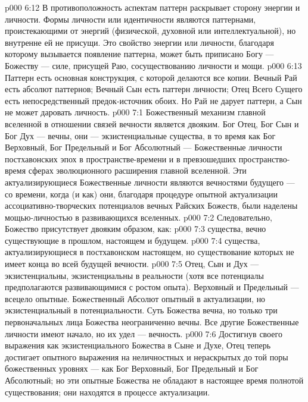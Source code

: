 \vs p000 6:12 В противоположность аспектам  паттерн раскрывает  сторону энергии и личности. Формы личности или идентичности являются паттернами, проистекающими от энергий (физической, духовной или интеллектуальной), но внутренне ей не присущи. Это свойство энергии или личности, благодаря которому вызывается появление паттерна, может быть приписано Богу --- Божеству --- силе, присущей Раю, сосуществованию личности и мощи.
\vs p000 6:13 Паттерн есть основная конструкция, с которой делаются все копии. Вечный Рай есть абсолют паттернов; Вечный Сын есть паттерн личности; Отец Всего Сущего есть непосредственный предок\hyp{}источник обоих. Но Рай не дарует паттерн, а Сын не может даровать личность.
\vs p000 7:1 Божественный механизм главной вселенной в отношении связей вечности является двояким. Бог Отец, Бог Сын и Бог Дух --- вечны, они --- экзистенциальные существа, в то время как Бог Верховный, Бог Предельный и Бог Абсолютный ---  Божественные личности постхавонских эпох в пространстве\hyp{}времени и в превзошедших пространство\hyp{}время сферах эволюционного расширения главной вселенной. Эти актуализирующиеся Божественные личности являются вечностями будущего --- со времени, когда (и как) они, благодаря процедуре опытной актуализации ассоциативно\hyp{}творческих потенциалов вечных Райских Божеств, были наделены мощью\hyp{}личностью в развивающихся вселенных.
\vs p000 7:2 Следовательно, Божество присутствует двояким образом, как:
\vs p000 7:3 \bibnobreakspace {} существа, вечно существующие в прошлом, настоящем и будущем.
\vs p000 7:4 \bibnobreakspace {} существа, актуализирующиеся в постхавонском настоящем, но существование которых не имеет конца во всей будущей вечности.
\vs p000 7:5 \pc Отец, Сын и Дух --- экзистенциальны, экзистенциальны в реальности (хотя все потенциалы предполагаются развивающимися с ростом опыта). Верховный и Предельный --- всецело опытные. Божественный Абсолют опытный в актуализации, но экзистенциальный в потенциальности. Суть Божества вечна, но только три первоначальных лица Божества неограниченно вечны. Все другие Божественные личности имеют начало, но их удел --- вечность.
\vs p000 7:6 Достигнув своего выражения как экзистенциального Божества в Сыне и Духе, Отец теперь достигает опытного выражения на неличностных и нераскрытых до той поры божественных уровнях --- как Бог Верховный, Бог Предельный и Бог Абсолютный; но эти опытные Божества не обладают в настоящее время полнотой существования; они находятся в процессе актуализации.
